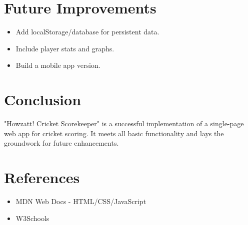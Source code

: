 \documentclass[12pt]{article}
\begin{document}
\section{Future Improvements}
\begin{itemize}
    \item Add localStorage/database for persistent data.
    \item Include player stats and graphs.
    \item Build a mobile app version.
\end{itemize}

\section{Conclusion}
"Howzatt! Cricket Scorekeeper" is a successful implementation of a single-page web app for cricket scoring. It meets all basic functionality and lays the groundwork for future enhancements.

\section*{References}
\begin{itemize}
    \item MDN Web Docs - HTML/CSS/JavaScript
    \item W3Schools
\end{itemize}
\end{document}
